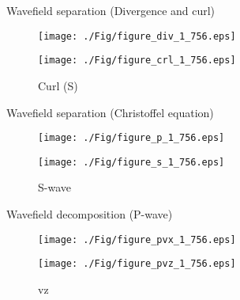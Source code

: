\documentclass[aspectratio=169]{beamer}
\begin{document}
\begin{frame}{Wavefield separation (Divergence and curl)}
   \begin{figure}[ht]
        \begin{minipage}[b]{0.45\linewidth}
            \centering
            \texttt{[image: ./Fig/figure\_div\_1\_756.eps]}
            \caption{Divergence (P)}
        \end{minipage}
        \hspace{0.5cm}
        \begin{minipage}[b]{0.45\linewidth}
            \centering
            \texttt{[image: ./Fig/figure\_crl\_1\_756.eps]}
            \caption{Curl (S)}
        \end{minipage}
    \end{figure}
\end{frame}
\begin{frame}{Wavefield separation (Christoffel equation)}
   \begin{figure}[ht]
        \begin{minipage}[b]{0.45\linewidth}
            \centering
            \texttt{[image: ./Fig/figure\_p\_1\_756.eps]}
            \caption{P-wave}
        \end{minipage}
        \hspace{0.5cm}
        \begin{minipage}[b]{0.45\linewidth}
            \centering
            \texttt{[image: ./Fig/figure\_s\_1\_756.eps]}
            \caption{S-wave}
        \end{minipage}
    \end{figure}
\end{frame}
\begin{frame}{Wavefield decomposition (P-wave)}
   \begin{figure}[ht]
        \begin{minipage}[b]{0.45\linewidth}
            \centering
            \texttt{[image: ./Fig/figure\_pvx\_1\_756.eps]}
            \caption{vx}
        \end{minipage}
        \hspace{0.5cm}
        \begin{minipage}[b]{0.45\linewidth}
            \centering
            \texttt{[image: ./Fig/figure\_pvz\_1\_756.eps]}
            \caption{vz}
        \end{minipage}
    \end{figure}

\end{frame}
\end{document}
